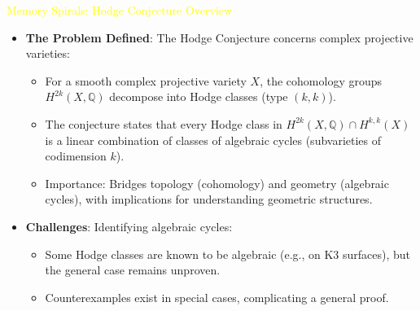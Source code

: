\textcolor{yellow}{ Memory Spirals: Hodge Conjecture Overview } \\
\begin{itemize}
    \item \texttt{} \textbf{The Problem Defined}: The Hodge Conjecture concerns complex projective varieties:
    \begin{itemize}
        \item For a smooth complex projective variety \(X\), the cohomology groups \(H^{2k}(X, \mathbb{Q})\) decompose into Hodge classes (type \((k,k)\)).
        \item The conjecture states that every Hodge class in \(H^{2k}(X, \mathbb{Q}) \cap H^{k,k}(X)\) is a linear combination of classes of algebraic cycles (subvarieties of codimension \(k\)).
        \item Importance: Bridges topology (cohomology) and geometry (algebraic cycles), with implications for understanding geometric structures.
    \end{itemize}
    \item \texttt{} \textbf{Challenges}: Identifying algebraic cycles:
    \begin{itemize}
        \item Some Hodge classes are known to be algebraic (e.g., on K3 surfaces), but the general case remains unproven.
        \item Counterexamples exist in special cases, complicating a general proof.
    \end{itemize}
\end{itemize}

